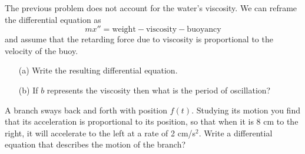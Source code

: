 \begin{problem}
    The previous problem does not account for the water's viscosity.  We can reframe the
    differential equation as 
    \[ mx'' = \text{weight} - \text{viscosity} - \text{buoyancy} \]
    and assume that the retarding force due to viscosity is proportional to the
    velocity of the buoy.
    \begin{itemize}
        \item[(a)] Write the resulting differential equation.
        \item[(b)] If $b$ represents the viscosity then what is the period of oscillation?
    \end{itemize}
\end{problem}
\solution{
    \[ \rho \pi r^2 h x'' = \pi r^2 h \rho g - b x' - \pi r^2 g x \implies x'' =
        \frac{g}{\rho h} \left( \rho h - x \right) - \frac{b}{\rho \pi r^2 h} x' 
    \]
    \[ \implies y'' + \frac{b}{\rho \pi r^2 h} y' + \frac{g}{\rho h} y = 0 \]
    \[ \implies k = \frac{-B \pm \sqrt{B^2 - 4 \frac{g}{\rho h}}}{2} =
        \frac{\frac{b}{\rho \pi r^2 h} \pm \sqrt{\frac{b^2}{\rho^2 \pi^2 r^4 h^2} -
    \frac{4g}{\rho h}   } }{2} \]
    \[ \implies \text{frequency} =\frac{1}{2} \sqrt{\frac{b^2}{\rho^2 \pi^2 r^4 h^2} -
    \frac{4g}{\rho h}} \]

}

\begin{problem}
    A branch sways back and forth with position $f(t)$.  Studying its motion you find that
    its acceleration is proportional to its position, so that when it is 8 cm to the
    right, it will accelerate to the left at a rate of 2 cm/s$^2$.  Write a differential
    equation that describes the motion of the branch?
% 
\end{problem}
%             

